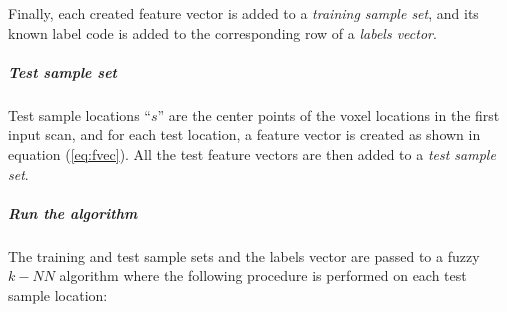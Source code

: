 Finally, each created feature vector is added to a \textit{training sample set},
and its known label code is added to the corresponding row of a \textit{labels vector}.

\subparagraph*{Test sample set} %

Test sample locations ``$s$'' are the center points of the voxel locations in the first input scan, and for each test location, a feature vector is created as shown in equation (\ref{eq:fvec}). All the test feature vectors are then added to a \textit{test sample set}.

\subparagraph*{Run the algorithm} %

The training and test sample sets and the labels vector are passed to a fuzzy $k-NN$ algorithm
where the following procedure is performed on each test sample location:

